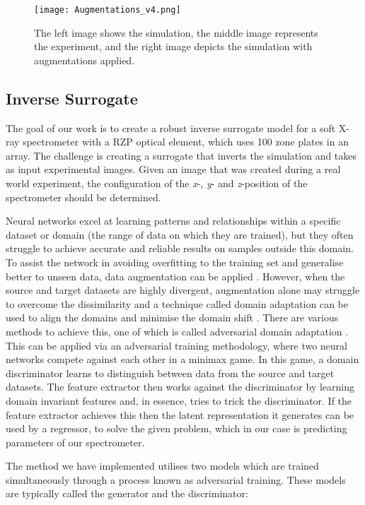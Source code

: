 \documentclass{iopconfser}
\begin{document}
\begin{figure}[H]
    \centering
    \texttt{[image: Augmentations\_v4.png]}
    \caption{The left image shows the simulation, the middle image represents the experiment, and the right image depicts the simulation with augmentations applied.}
\label{augmentations}
\end{figure}

\subsection{Inverse Surrogate}
The goal of our work is to create a robust inverse surrogate model for a soft X-ray spectrometer with a RZP optical element, which uses 100 zone plates in an array. The challenge is creating a surrogate that inverts the simulation and takes as input experimental images. Given an image that was created during a real world experiment, the configuration of the \textit{x}-, \textit{y}- and \textit{z}-position of the spectrometer should be determined.

Neural networks excel at learning patterns and relationships within a specific dataset or domain (the range of data on which they are trained), but they often struggle to achieve accurate and reliable results on samples outside this domain. To assist the network in avoiding overfitting to the training set and generalise better to unseen data, data augmentation can be applied \cite{2022GloTP}. However, when the source and target datasets are highly divergent, augmentation alone may struggle to overcome the dissimilarity and a technique called domain adaptation can be used to align the domains and minimise the domain shift \cite{Csurka2017}. There are various methods to achieve this, one of which is called adversarial domain adaptation \cite{8099799}. This can be applied via an adversarial training methodology, where two neural networks compete against each other in a minimax game. In this game, a domain discriminator learns to distinguish between data from the source and target datasets. The feature extractor then works against the discriminator by learning domain invariant features and, in essence, tries to trick the discriminator. If the feature extractor achieves this then the latent representation it generates can be used by a regressor, to solve the given problem, which in our case is predicting parameters of our spectrometer.

The method we have implemented utilises two models which are trained simultaneously through a process known as adversarial training. These models are typically called the generator and the discriminator:
\end{document}
